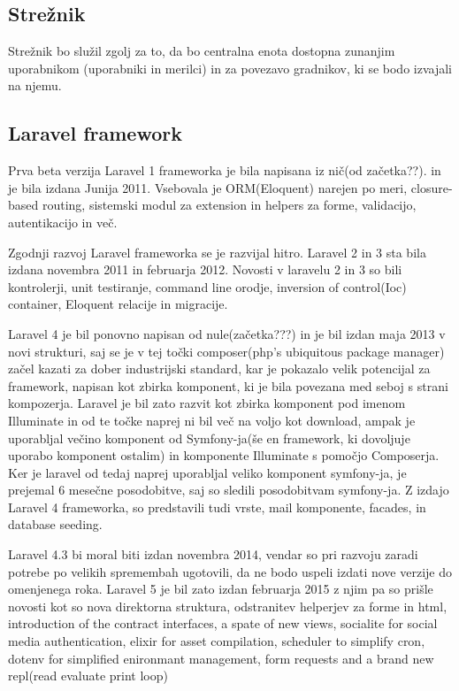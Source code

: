 \documentclass[12pt,a4paper,titlepage,openany]{report}
\begin{document}
\subsection{Strežnik}
Strežnik bo služil zgolj za to, da bo centralna enota dostopna zunanjim uporabnikom (uporabniki in merilci) in za povezavo gradnikov, ki se bodo izvajali na njemu.


\subsection{Laravel framework}
Prva beta verzija Laravel 1 frameworka je bila napisana iz nič(od začetka??). in je bila izdana Junija 2011. Vsebovala je ORM(Eloquent) narejen po meri, closure-based routing, sistemski modul za extension in helpers za forme, validacijo, autentikacijo in več.

Zgodnji razvoj Laravel frameworka se je razvijal hitro. Laravel 2 in 3 sta bila izdana novembra 2011 in februarja 2012. Novosti v laravelu 2 in 3 so bili kontrolerji, unit testiranje, command line orodje, inversion of control(Ioc) container, Eloquent relacije in migracije.

Laravel 4 je bil ponovno napisan od nule(začetka???) in je bil izdan maja 2013 v novi strukturi, saj se je v tej točki composer(php's ubiquitous package manager) začel kazati za dober industrijski standard, kar je pokazalo velik potencijal za framework, napisan kot zbirka komponent, ki je bila povezana med seboj s strani kompozerja. Laravel je bil zato razvit kot zbirka komponent pod imenom Illuminate in od te točke naprej ni bil več na voljo kot download, ampak je uporabljal večino komponent od Symfony-ja(še en framework, ki dovoljuje uporabo komponent ostalim) in komponente Illuminate s pomočjo Composerja. Ker je laravel od tedaj naprej uporabljal veliko komponent symfony-ja, je prejemal 6 mesečne posodobitve, saj so sledili posodobitvam symfony-ja. Z izdajo Laravel 4 frameworka, so predstavili tudi vrste, mail komponente, facades, in database seeding.

Laravel 4.3 bi moral biti izdan novembra 2014, vendar so pri razvoju zaradi potrebe po velikih spremembah ugotovili, da ne bodo uspeli izdati nove verzije do omenjenega roka. Laravel 5 je bil zato izdan februarja 2015 z njim pa so prišle novosti kot so nova direktorna struktura, odstranitev helperjev za forme in html, introduction of the contract interfaces, a spate of new views, socialite for social media authentication, elixir for asset compilation, scheduler to simplify cron, dotenv for simplified enironmant management, form requests and a brand new repl(read evaluate print loop)
\end{document}
